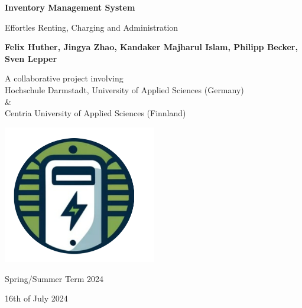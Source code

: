 \begin{titlepage}
    \begin{center}
            
        \Huge
        \textbf{Inventory Management System}
            
        \vspace{0.3cm}
        \large
        Effortles Renting, Charging and Administration
            
        \vspace{1.0cm}
            
        \textbf{
        Felix Huther,
        Jingya Zhao,
        Kandaker Majharul Islam,
        Philipp Becker,
        Sven Lepper }
          
        \vfill            
        A collaborative project involving\\
        Hochschule Darmstadt, University of Applied Sciences (Germany) \\\&\\
        Centria University of Applied Sciences (Finnland)

        \vspace{0.5cm}
            
        \includegraphics[width=0.5\textwidth]{images/logo.png}

            
        \Large
      
        Spring/Summer Term 2024

        \small
        16th of July 2024
            
    \end{center}
\end{titlepage}

